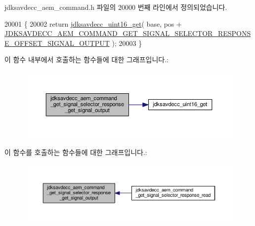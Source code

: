jdksavdecc\+\_\+aem\+\_\+command.\+h 파일의 20000 번째 라인에서 정의되었습니다.


\begin{DoxyCode}
20001 \{
20002     \textcolor{keywordflow}{return} \hyperlink{group__endian_ga3fbbbc20be954aa61e039872965b0dc9}{jdksavdecc\_uint16\_get}( base, pos + 
      \hyperlink{group__command__get__signal__selector__response_ga086c9ac6dbd4d27dd99c50e351f35856}{JDKSAVDECC\_AEM\_COMMAND\_GET\_SIGNAL\_SELECTOR\_RESPONSE\_OFFSET\_SIGNAL\_OUTPUT}
       );
20003 \}
\end{DoxyCode}


이 함수 내부에서 호출하는 함수들에 대한 그래프입니다.\+:
\nopagebreak
\begin{figure}[H]
\begin{center}
\leavevmode
\includegraphics[width=350pt]{group__command__get__signal__selector__response_ga3960c6b55f6717c0cf314a97ee33c685_cgraph}
\end{center}
\end{figure}




이 함수를 호출하는 함수들에 대한 그래프입니다.\+:
\nopagebreak
\begin{figure}[H]
\begin{center}
\leavevmode
\includegraphics[width=350pt]{group__command__get__signal__selector__response_ga3960c6b55f6717c0cf314a97ee33c685_icgraph}
\end{center}
\end{figure}


